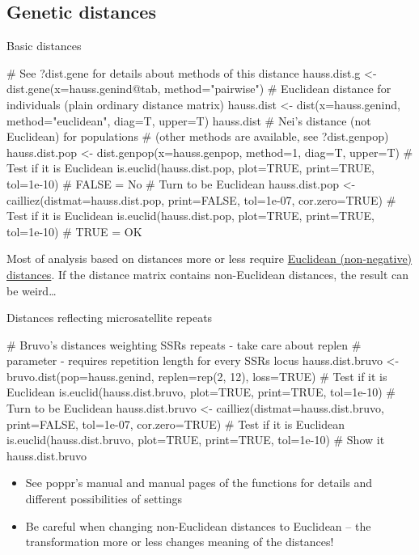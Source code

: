 \documentclass[compress, ucs, xelatex, 11pt, xcolor=svgnames,
  hyperref={
    bookmarks=true,
    unicode=true,
    colorlinks=true,
    pdftitle={Molecular data in R},
    plainpages=false,
    pdfauthor={Vojtech Zeisek},
    pdfsubject={Course about phylogeny and evolution in R},
    pdfcreator={XeLaTeX},
    pdfkeywords={R, evolution, phylogeny, molecular data},
    linkcolor=Tomato,
    anchorcolor=SaddleBrown,
    citecolor=Goldenrod,
    filecolor=DarkMagenta,
    menucolor=Sienna,
    urlcolor=DarkTurquoise,
    pdftex},
  url={hyphens, lowtilde} %
  ]{beamer}
\begin{document}
\subsection{Genetic distances}

\begin{frame}[fragile]{Basic distances}
  \begin{spluscode}
    # See ?dist.gene for details about methods of this distance
    hauss.dist.g <- dist.gene(x=hauss.genind@tab, method="pairwise")
    # Euclidean distance for individuals (plain ordinary distance matrix)
    hauss.dist <- dist(x=hauss.genind, method="euclidean", diag=T, upper=T)
    hauss.dist
    # Nei's distance (not Euclidean) for populations
    # (other methods are available, see ?dist.genpop)
    hauss.dist.pop <- dist.genpop(x=hauss.genpop, method=1, diag=T, upper=T)
    # Test if it is Euclidean
    is.euclid(hauss.dist.pop, plot=TRUE, print=TRUE, tol=1e-10) # FALSE = No
    # Turn to be Euclidean
    hauss.dist.pop <- cailliez(distmat=hauss.dist.pop, print=FALSE,
      tol=1e-07, cor.zero=TRUE)
    # Test if it is Euclidean
    is.euclid(hauss.dist.pop, plot=TRUE, print=TRUE, tol=1e-10) # TRUE = OK
  \end{spluscode}

Most of analysis based on distances more or less require \href{https://en.wikipedia.org/wiki/Euclidean_distance_matrix}{Euclidean (non-negative) distances}. If the distance matrix contains non-Euclidean distances, the result can be weird\ldots
\end{frame}

\begin{frame}[fragile]{Distances reflecting microsatellite repeats}
  \begin{spluscode}
    # Bruvo's distances weighting SSRs repeats - take care about replen
    # parameter - requires repetition length for every SSRs locus
    hauss.dist.bruvo <- bruvo.dist(pop=hauss.genind, replen=rep(2, 12),
      loss=TRUE)
    # Test if it is Euclidean
    is.euclid(hauss.dist.bruvo, plot=TRUE, print=TRUE, tol=1e-10)
    # Turn to be Euclidean
    hauss.dist.bruvo <- cailliez(distmat=hauss.dist.bruvo, print=FALSE,
      tol=1e-07, cor.zero=TRUE)
    # Test if it is Euclidean
    is.euclid(hauss.dist.bruvo, plot=TRUE, print=TRUE, tol=1e-10)
    # Show it
    hauss.dist.bruvo
  \end{spluscode}
  \begin{itemize}
    \item See poppr's manual and manual pages of the functions for details and different possibilities of settings
    \item Be careful when changing non-Euclidean distances to Euclidean -- \alert{the transformation more or less changes meaning of the distances!}
  \end{itemize}
\end{frame}
\end{document}
